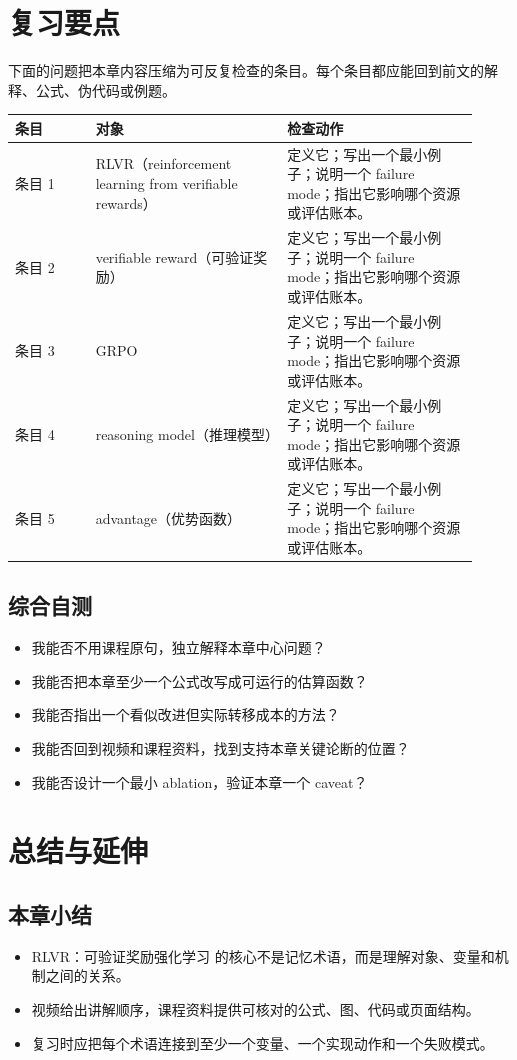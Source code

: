 \documentclass[a4paper]{article}
\begin{document}
\section{复习要点}
下面的问题把本章内容压缩为可反复检查的条目。每个条目都应能回到前文的解释、公式、伪代码或例题。
\begin{longtable}{p{0.16\linewidth}p{0.38\linewidth}p{0.38\linewidth}}
\toprule
\textbf{条目} & \textbf{对象} & \textbf{检查动作}\\
\midrule
条目 1 & RLVR（reinforcement learning from verifiable rewards） & 定义它；写出一个最小例子；说明一个 failure mode；指出它影响哪个资源或评估账本。\\
条目 2 & verifiable reward（可验证奖励） & 定义它；写出一个最小例子；说明一个 failure mode；指出它影响哪个资源或评估账本。\\
条目 3 & GRPO & 定义它；写出一个最小例子；说明一个 failure mode；指出它影响哪个资源或评估账本。\\
条目 4 & reasoning model（推理模型） & 定义它；写出一个最小例子；说明一个 failure mode；指出它影响哪个资源或评估账本。\\
条目 5 & advantage（优势函数） & 定义它；写出一个最小例子；说明一个 failure mode；指出它影响哪个资源或评估账本。\\
\bottomrule
\end{longtable}
\subsection{综合自测}
\begin{itemize}
\item 我能否不用课程原句，独立解释本章中心问题？
\item 我能否把本章至少一个公式改写成可运行的估算函数？
\item 我能否指出一个看似改进但实际转移成本的方法？
\item 我能否回到视频和课程资料，找到支持本章关键论断的位置？
\item 我能否设计一个最小 ablation，验证本章一个 caveat？
\end{itemize}
\section{总结与延伸}
\subsection{本章小结}
\begin{itemize}
\item RLVR：可验证奖励强化学习 的核心不是记忆术语，而是理解对象、变量和机制之间的关系。
\item 视频给出讲解顺序，课程资料提供可核对的公式、图、代码或页面结构。
\item 复习时应把每个术语连接到至少一个变量、一个实现动作和一个失败模式。
\end{itemize}
\end{document}
